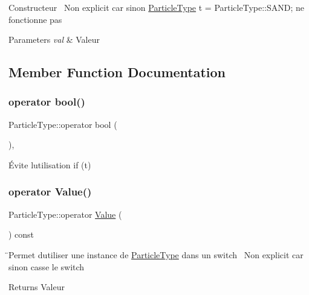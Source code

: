 Constructeur~\newline
 Non explicit car sinon {\ttfamily \hyperlink{classParticleType}{Particle\+Type} t = Particle\+Type\+::\+S\+A\+ND;} ne fonctionne pas 
\begin{DoxyParams}{Parameters}
{\em val} & Valeur \\
\hline
\end{DoxyParams}


\subsection{Member Function Documentation}
\mbox{\label{classParticleType_a1baf587591dfcd8ed5ba2a98b871d5da}} 
\subsubsection{\texorpdfstring{operator bool()}{operator bool()}}
{\footnotesize\ttfamily Particle\+Type\+::operator bool (\begin{DoxyParamCaption}{ }\end{DoxyParamCaption})\hspace{0.3cm}{\ttfamily [explicit]}, {\ttfamily [delete]}}

Évite l\textquotesingle{}utilisation {\ttfamily if (t)} \mbox{\label{classParticleType_ab7635a9010b4793e4c7dac080479830c}} 
\subsubsection{\texorpdfstring{operator Value()}{operator Value()}}
{\footnotesize\ttfamily Particle\+Type\+::operator \hyperlink{classParticleType_a8b6a4b693e21bbda6c3a1181440df746}{Value} (\begin{DoxyParamCaption}{ }\end{DoxyParamCaption}) const}

̈\+Permet d\textquotesingle{}utiliser une instance de \hyperlink{classParticleType}{Particle\+Type} dans un switch~\newline
 Non explicit car sinon casse le switch \begin{DoxyReturn}{Returns}
Valeur 
\end{DoxyReturn}
\mbox{\label{classParticleType_ad7726216d73eb6df3200503160276154}} 
